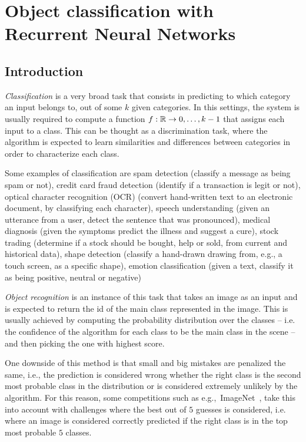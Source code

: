 \chapter{Object classification with Recurrent Neural Networks}\label{sec:renet}

\section{Introduction}\label{sec:renet_intro}

\emph{Classification} is a very broad task that consists in predicting to which
category an input belongs to, out of some $k$ given categories. In this
settings, the system is usually required to compute a function $f: \mathbb{R} \to {0,
\dots, k-1}$ that assigns each input to a class. This can be thought as a
discrimination task, where the algorithm is expected to learn similarities and
differences between categories in order to characterize each class.

Some examples of classification are spam detection (classify a message as being
spam or not), credit card fraud detection (identify if a transaction is legit
or not), optical character recognition (OCR) (convert hand-written text to an
electronic document, by classifying each character), speech understanding
(given an utterance from a user, detect the sentence that was pronounced),
medical diagnosis (given the symptoms predict the illness and suggest a cure),
stock trading (determine if a stock should be bought, help or sold, from
current and historical data), shape detection (classify a hand-drawn drawing
from, e.g., a touch screen, as a specific shape), emotion classification (given
a text, classify it as being positive, neutral or negative)

\emph{Object recognition} is an instance of this task that takes an image as an
input and is expected to return the id of the main class represented in the
image. This is usually achieved by computing the probability distribution over
the classes -- i.e. the confidence of the algorithm for each class to be the
main class in the scene -- and then picking the one with highest score.

One downside of this method is that small and big mistakes are penalized the
same, i.e., the prediction is considered wrong whether the right class is the
second most probable class in the distribution or is considered extremely
unlikely by the algorithm. For this reason, some competitions such as
e.g.,~ImageNet~\citep{imagenet_cvpr09, ILSVRCarxiv14}, take this into account
with challenges where the best out of $5$ guesses is considered, i.e. where an
image is considered correctly predicted if the right class is in the top most
probable $5$ classes.

